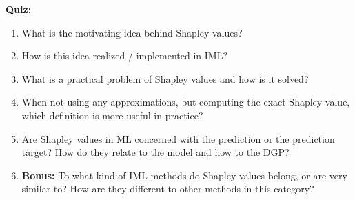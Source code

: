 \textbf{Quiz:}
\begin{enumerate}
    \item What is the motivating idea behind Shapley values? 
    \item How is this idea realized / implemented in IML?
    \item What is a practical problem of Shapley values and how is it solved?
    \item When not using any approximations, but computing the exact Shapley value, which definition is more useful in practice?
    \item Are Shapley values in ML concerned with the prediction or the prediction target? How do they relate to the model and how to the DGP?
    \item \textbf{Bonus:} To what kind of IML methods do Shapley values belong, or are very similar to? How are they different to other methods in this category?
\end{enumerate}
